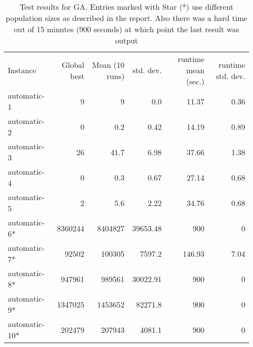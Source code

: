 \documentclass [11pt]{article}
\begin{document}
\newpage


\begin{sidewaystable}
  \centering
 \label{fig:results}
  \everyrow{\hline}
  \begin{tabu} {| l |r | r |r |r|r |}
  Instance        & Global best   & Mean (10 runs)   & std. dev. & runtime mean (sec.) & runtime std. dev.    \\ 
  automatic-1     & 9             & 9                   & 0.0           &  11.37 & 0.36       \\ 
  automatic-2     & 0             & 0.2                & 0.42          &  14.19 & 0.89      \\ 
  automatic-3     & 26            & 41.7                & 6.98          & 37.66 &1.38       \\ 
  automatic-4     & 0             & 0.3                 & 0.67          &  27.14 & 0.68       \\ 
  automatic-5     & 2             & 5.6                & 2.22          &  34.76 & 0.68      \\ 
  automatic-6*     & 8360244       & 8404827           & 39653.48      &  900 & 0        \\ 
  automatic-7*     & 92502        & 100305            & 7597.2       &  146.93 & 7.04        \\ 
  automatic-8*     & 947961        & 989561              & 30022.91       &  900 &0        \\ 
  automatic-9*     & 1347025        & 1453652              & 82271.8        &  900 &0        \\ 
  automatic-10*    & 202479         & 207943               & 4081.1        &  900 &0        \\ 
\end{tabu}
\caption{Test results for GA. Entries marked with Star (*) use different population sizes as described in the report. Also there was a hard time out of 15 minutes (900 seconds) at which point the last result was output} 
\end{sidewaystable}
\end{document}
